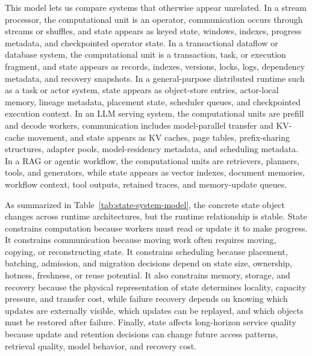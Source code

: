 \documentclass[acmsmall,screen,review]{acmart}
\begin{document}
This model lets us compare systems that otherwise appear unrelated. In a stream processor, the computational unit is an operator, communication occurs through streams or shuffles, and state appears as keyed state, windows, indexes, progress metadata, and checkpointed operator state. In a transactional dataflow or database system, the computational unit is a transaction, task, or execution fragment, and state appears as records, indexes, versions, locks, logs, dependency metadata, and recovery snapshots. In a general-purpose distributed runtime such as a task or actor system, state appears as object-store entries, actor-local memory, lineage metadata, placement state, scheduler queues, and checkpointed execution context. In an LLM serving system, the computational units are prefill and decode workers, communication includes model-parallel transfer and KV-cache movement, and state appears as KV caches, page tables, prefix-sharing structures, adapter pools, model-residency metadata, and scheduling metadata. In a RAG or agentic workflow, the computational units are retrievers, planners, tools, and generators, while state appears as vector indexes, document memories, workflow context, tool outputs, retained traces, and memory-update queues.

As summarized in Table~\ref{tab:state-system-model}, the concrete state object changes across runtime architectures, but the runtime relationship is stable. State constrains computation because workers must read or update it to make progress. It constrains communication because moving work often requires moving, copying, or reconstructing state. It constrains scheduling because placement, batching, admission, and migration decisions depend on state size, ownership, hotness, freshness, or reuse potential. It also constrains memory, storage, and recovery because the physical representation of state determines locality, capacity pressure, and transfer cost, while failure recovery depends on knowing which updates are externally visible, which updates can be replayed, and which objects must be restored after failure. Finally, state affects long-horizon service quality because update and retention decisions can change future access patterns, retrieval quality, model behavior, and recovery cost.
\end{document}
